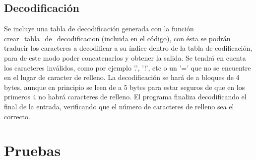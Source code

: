 \documentclass[a4paper,11pt, margin=1in]{article}
\begin{document}
\subsection{Decodificación}
Se incluye una tabla de decodificación generada con la función crear\_tabla\_de\_decodificacion (incluida en el código), con ésta se podrán traducir los caracteres a decodificar a su índice dentro de la tabla de codificación, para de este modo poder concatenarlos y obtener la salida. Se tendrá en cuenta los caracteres inválidos, como por ejemplo '.', '!', etc o un '=' que no se encuentre en el lugar de caracter de relleno.
La decodificación se hará de a bloques de 4 bytes, aunque en principio se leen de a 5 bytes para estar seguros de que en los primeros 4 no habrá caracteres de relleno. El programa finaliza decodificando el final de la entrada, verificando que el número de caracteres de relleno sea el correcto.



\section{Pruebas}
\end{document}
